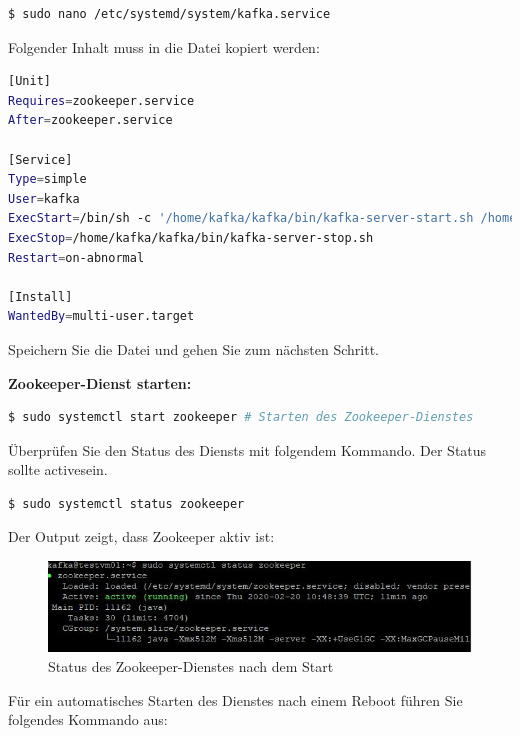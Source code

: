 \documentclass[a4paper,titlepage,halfparskip,12pt]{scrreprt}
\begin{document}
\begin{onehalfspacing}
\begin{lstlisting}[language=Bash]
$ sudo nano /etc/systemd/system/kafka.service
\end{lstlisting}

Folgender Inhalt muss in die Datei kopiert werden:

\smallskip

\begin{lstlisting}[language=Bash]
[Unit]
Requires=zookeeper.service
After=zookeeper.service

[Service]
Type=simple
User=kafka
ExecStart=/bin/sh -c '/home/kafka/kafka/bin/kafka-server-start.sh /home/kafka/kafka/config/server.properties > /home/kafka/kafka/kafka.log 2>&1'
ExecStop=/home/kafka/kafka/bin/kafka-server-stop.sh
Restart=on-abnormal

[Install]
WantedBy=multi-user.target
\end{lstlisting}

Speichern Sie die Datei und gehen Sie zum nächsten Schritt.

\textbf{Zookeeper-Dienst starten:}

\bigskip

\begin{lstlisting}[language=Bash]
$ sudo systemctl start zookeeper # Starten des Zookeeper-Dienstes
\end{lstlisting}

Überprüfen Sie den Status des Diensts mit folgendem Kommando. Der Status sollte \glqq active\grqq sein.

\smallskip

\begin{lstlisting}[language=Bash]
$ sudo systemctl status zookeeper
\end{lstlisting}

Der Output zeigt, dass Zookeeper aktiv ist:

\begin{figure}[h]
	\centering
	\includegraphics{images/StatusZookeeper}
	\caption{Status des Zookeeper-Dienstes nach dem Start}
	\label{img:StatusZookeeper}
\end{figure}

Für ein automatisches Starten des Dienstes nach einem Reboot führen Sie folgendes Kommando aus:


\end{onehalfspacing}
\end{document}
